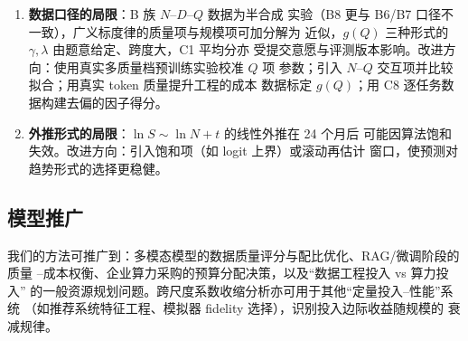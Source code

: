 \begin{enumerate}
\item \textbf{数据口径的局限}：B 族 $N$--$D$--$Q$ 数据为半合成
实验（B8 更与 B6/B7 口径不一致），广义标度律的质量项与规模项可加分解为
近似，$g(Q)$ 三种形式的 $\gamma,\lambda$ 由题意给定、跨度大，C1 平均分亦
受提交意愿与评测版本影响。改进方向：使用真实多质量档预训练实验校准 $Q$ 项
参数；引入 $N$--$Q$ 交互项并比较拟合；用真实 token 质量提升工程的成本
数据标定 $g(Q)$；用 C8 逐任务数据构建去偏的因子得分。
\item \textbf{外推形式的局限}：$\ln S\sim\ln N+t$ 的线性外推在 24 个月后
可能因算法饱和失效。改进方向：引入饱和项（如 logit 上界）或滚动再估计
窗口，使预测对趋势形式的选择更稳健。
\end{enumerate}

\subsection{模型推广}

我们的方法可推广到：多模态模型的数据质量评分与配比优化、RAG/微调阶段的质量
--成本权衡、企业算力采购的预算分配决策，以及``数据工程投入 vs 算力投入''
的一般资源规划问题。跨尺度系数收缩分析亦可用于其他``定量投入--性能''系统
（如推荐系统特征工程、模拟器 fidelity 选择），识别投入边际收益随规模的
衰减规律。